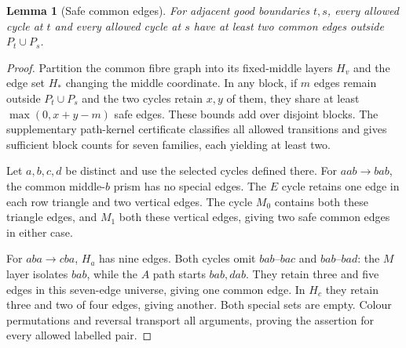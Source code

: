 \documentclass[11pt]{article}
\newtheorem{lemma}[theorem]{Lemma}
\theoremstyle{remark}
\numberwithin{equation}{section}
\numberwithin{table}{section}
\begin{document}
\begin{lemma}[Safe common edges]\label{lem:pathsafe}
For adjacent good boundaries $t,s$, every allowed cycle at $t$ and
every allowed cycle at $s$ have at least two common edges outside
$P_t\cup P_s$.
\end{lemma}
\begin{proof}
Partition the common fibre graph into its fixed-middle layers $H_v$
and the edge set $H_*$ changing the middle coordinate. In any block,
if $m$ edges remain outside $P_t\cup P_s$ and the two cycles retain
$x,y$ of them, they share at least $\max(0,x+y-m)$ safe edges.
These bounds add over disjoint blocks. The supplementary path-kernel certificate
classifies all allowed transitions and gives sufficient block counts
for seven families, each yielding at least two.

Let $a,b,c,d$ be distinct and use the selected cycles defined there.
For $aab\to bab$, the common middle-$b$ prism has no special edges.
The $E$ cycle retains one edge in each row triangle and two vertical
edges. The cycle $M_0$ contains both these triangle edges, and $M_1$
both these vertical edges, giving two safe common edges in either case.

For $aba\to cba$, $H_a$ has nine edges. Both cycles omit
$bab$--$bac$ and $bab$--$bad$: the $M$ layer isolates $bab$, while
the $A$ path starts $bab,dab$. They retain three and five edges in
this seven-edge universe, giving one common edge. In $H_c$ they
retain three and two of four edges, giving another. Both special
sets are empty. Colour permutations and reversal transport all
arguments, proving the assertion for every allowed labelled pair.
\end{proof}
\end{document}
